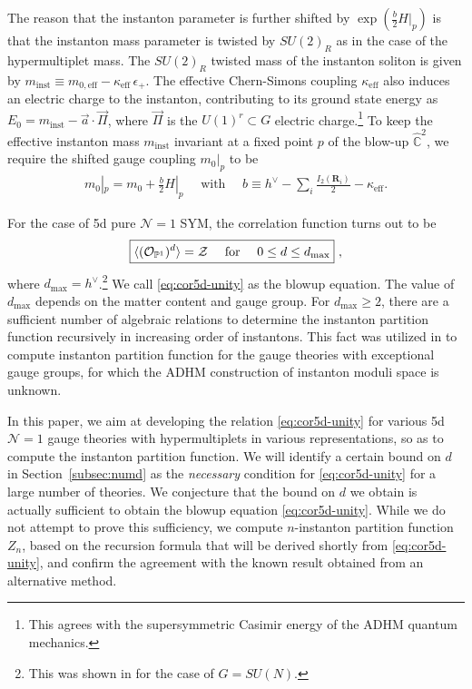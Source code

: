 \documentclass[letterpaper, 11pt]{article}
\def\IC{\mathbb{C}}
\def\IP{\mathbb{P}}
\def\CZ{{\cal Z}}
\def\e{\epsilon}
\def\k{\kappa}
\begin{document}
The reason that the instanton parameter is further shifted by $\exp(\frac{b}{2} H|_p) $ is that the instanton mass parameter is twisted by $SU(2)_R$ as in the case of the hypermultiplet mass. The $SU(2)_R$ twisted mass of the instanton soliton is given by $m_\text{inst} \equiv m_{0, \textrm{eff}} - \kappa_\text{eff}\,\e_+$. The effective Chern-Simons coupling $\k_{\textrm{eff}}$ also induces an electric charge to the instanton, contributing to its ground state energy as $E_0 = m_\text{inst} - \vec{a} \cdot \vec{\Pi}$, where $\vec{\Pi}$ is the $U(1)^r \subset G$ electric charge.\footnote{This agrees with the supersymmetric Casimir energy of the ADHM quantum mechanics.} To keep the effective instanton mass $m_\text{inst}$ invariant at a fixed point $p$ of the blow-up $\hat{\IC}^2$, we require the shifted gauge coupling $m_0|_p$  to be 
\begin{align}
  \label{eq:coupling-shift}
  m_0|_p = m_0 + \frac{b}{2}H|_p \quad \text{ with }\quad
  b \equiv h^{\vee}-\sum_i\frac{I_2(\mathbf{R}_i)}{2} - \kappa_\text{eff}.
\end{align}

For the case of 5d pure $\mathcal{N}=1$ SYM, the correlation function turns out to be  
\begin{align}
  \label{eq:cor5d-unity}
\boxed{  \langle (\mathcal{O}_{\IP^1})^{d}\rangle = \CZ \quad \text{ for }\quad 0\leq d \leq d_\text{max} } \ , 
\end{align}
where $d_\text{max} = h^\vee$.\footnote{This was shown in \cite{Nakajima:2005fg} for the case of $G=SU(N)$.} We call \eqref{eq:cor5d-unity} as the blowup equation. The value of $d_{\text{max}}$ depends on the matter content and gauge group. For $d_\text{max} \geq 2$, there are a sufficient number of algebraic relations to determine the instanton partition function recursively in increasing order of instantons. This fact was utilized in \cite{Keller:2012da} to compute instanton partition function for the gauge theories with exceptional gauge groups, for which the ADHM construction of instanton moduli space is unknown. 

In this paper, we aim at developing the relation \eqref{eq:cor5d-unity} for various 5d 
$\mathcal{N}=1$ gauge theories with hypermultiplets in various representations, so as to compute the instanton partition function. We will identify a certain bound on $d$ in Section~\ref{subsec:numd} as the \emph{necessary} condition for \eqref{eq:cor5d-unity} for a large number of theories. 
We conjecture that the bound on $d$ we obtain is actually sufficient to obtain the blowup equation \eqref{eq:cor5d-unity}. While we do not attempt to prove this sufficiency, we compute $n$-instanton partition function $Z_n$, based on the recursion formula that will be derived shortly from \eqref{eq:cor5d-unity}, and confirm the agreement with the known result obtained from an alternative method.
\end{document}
